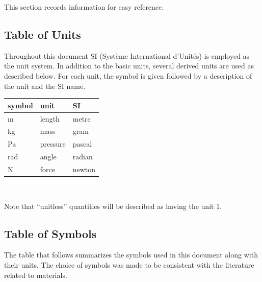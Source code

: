 \documentclass[12pt]{article}
\begin{document}
This section records information for easy reference.

\subsection{Table of Units}

Throughout this document SI (Syst\`{e}me International d'Unit\'{e}s) is employed
as the unit system.  In addition to the basic units, several derived units are
used as described below.  For each unit, the symbol is given followed by a
description of the unit and the SI name. ~\newline

\begin{center}
    \renewcommand{\arraystretch}{1.2}
    \noindent \begin{tabular}{l l l}
        \toprule
        \textbf{symbol} & \textbf{unit} & \textbf{SI} \\
        \midrule
        \si{\metre}     & length        & metre       \\
        \si{\kilo\gram} & mass          & gram        \\
        \si{\pascal}    & pressure      & pascal      \\
        \si{\radian}    & angle         & radian      \\
        \si{\newton}    & force         & newton      \\
        \bottomrule
    \end{tabular}\\
\end{center}

Note that ``unitless'' quantities will be described as having the unit $1$.

\subsection{Table of Symbols}

The table that follows summarizes the symbols used in this document along with
their units.  The choice of symbols was made to be consistent with the
literature related to materials.
\end{document}
